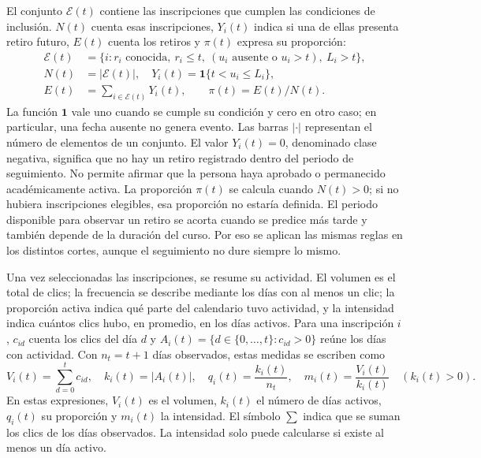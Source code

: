 El conjunto $\mathcal E(t)$ contiene las inscripciones que cumplen las condiciones de inclusión. $N(t)$ cuenta esas inscripciones, $Y_i(t)$ indica si una de ellas presenta retiro futuro, $E(t)$ cuenta los retiros y $\pi(t)$ expresa su proporción:
\begin{align}
\mathcal E(t)&=\{i:r_i\text{ conocida},\ r_i\le t,\ (u_i\text{ ausente o }u_i>t),\ L_i>t\},\label{corr:elegibilidad}\\
N(t)&=|\mathcal E(t)|,\quad Y_i(t)=\mathbf 1\{t<u_i\le L_i\},\label{corr:evento}\\
E(t)&=\sum_{i\in\mathcal E(t)}Y_i(t),\qquad \pi(t)=E(t)/N(t).\label{corr:prevalencia}
\end{align}
La función $\mathbf 1$ vale uno cuando se cumple su condición y cero en otro caso; en particular, una fecha ausente no genera evento. Las barras $|\cdot|$ representan el número de elementos de un conjunto. El valor $Y_i(t)=0$, denominado clase negativa, significa que no hay un retiro registrado dentro del periodo de seguimiento. No permite afirmar que la persona haya aprobado o permanecido académicamente activa. La proporción $\pi(t)$ se calcula cuando $N(t)>0$; si no hubiera inscripciones elegibles, esa proporción no estaría definida. El periodo disponible para observar un retiro se acorta cuando se predice más tarde y también depende de la duración del curso. Por eso se aplican las mismas reglas en los distintos cortes, aunque el seguimiento no dure siempre lo mismo.

Una vez seleccionadas las inscripciones, se resume su actividad. El volumen es el total de clics; la frecuencia se describe mediante los días con al menos un clic; la proporción activa indica qué parte del calendario tuvo actividad, y la intensidad indica cuántos clics hubo, en promedio, en los días activos. Para una inscripción $i$, $c_{id}$ cuenta los clics del día $d$ y $A_i(t)=\{d\in\{0,\ldots,t\}:c_{id}>0\}$ reúne los días con actividad. Con $n_t=t+1$ días observados, estas medidas se escriben como
\begin{equation}
V_i(t)=\sum_{d=0}^t c_{id},\quad k_i(t)=|A_i(t)|,\quad q_i(t)=\frac{k_i(t)}{n_t},\quad m_i(t)=\frac{V_i(t)}{k_i(t)}\quad(k_i(t)>0).\label{corr:actividad}
\end{equation}
En estas expresiones, $V_i(t)$ es el volumen, $k_i(t)$ el número de días activos, $q_i(t)$ su proporción y $m_i(t)$ la intensidad. El símbolo $\sum$ indica que se suman los clics de los días observados. La intensidad solo puede calcularse si existe al menos un día activo.

